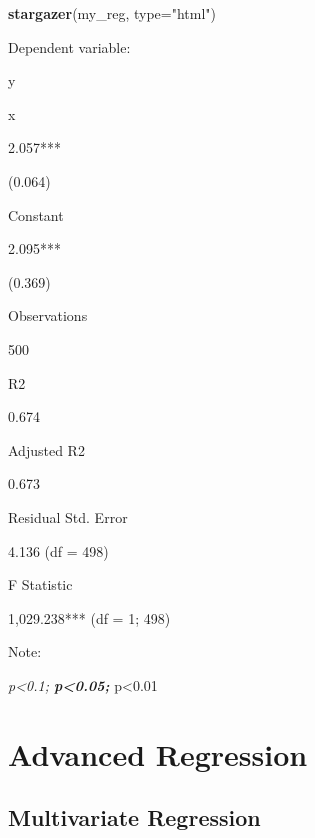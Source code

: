 \documentclass[]{book}
\newenvironment{Shaded}{\begin{snugshade}}{\end{snugshade}}
\newcommand{\KeywordTok}[1]{\textcolor[rgb]{0.13,0.29,0.53}{\textbf{#1}}}
\newcommand{\DataTypeTok}[1]{\textcolor[rgb]{0.13,0.29,0.53}{#1}}
\newcommand{\StringTok}[1]{\textcolor[rgb]{0.31,0.60,0.02}{#1}}
\newcommand{\NormalTok}[1]{#1}
\theoremstyle{definition}
\theoremstyle{definition}
\theoremstyle{definition}
\theoremstyle{remark}
\begin{document}
\begin{Shaded}
\begin{Highlighting}[]
\KeywordTok{stargazer}\NormalTok{(my_reg, }\DataTypeTok{type=}\StringTok{"html"}\NormalTok{) }
\end{Highlighting}
\end{Shaded}

Dependent variable:

y

x

2.057***

(0.064)

Constant

2.095***

(0.369)

Observations

500

R2

0.674

Adjusted R2

0.673

Residual Std. Error

4.136 (df = 498)

F Statistic

1,029.238*** (df = 1; 498)

Note:

\emph{p\textless{}0.1; \textbf{p\textless{}0.05; }}p\textless{}0.01

\chapter{Advanced Regression}\label{advanced-regression}

\section{Multivariate Regression}\label{multivariate-regression}
\end{document}
